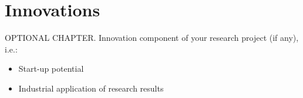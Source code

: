 \chapter*{Innovations}

OPTIONAL CHAPTER. Innovation component of your research project (if any), i.e.:
        \begin{itemize}
            \item Start-up potential 
            \item Industrial application of research results
        \end{itemize}